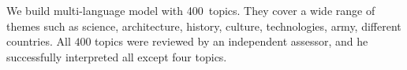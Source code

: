 \documentclass{sig-alternate}
\newcommand{\cond}{\mspace{3mu}{|}\mspace{3mu}}
\begin{document}
We build multi-language model with 400~topics.
They cover a wide range of themes such as science, architecture, history, culture, technologies, army, different countries.
All $400$ topics were reviewed by an independent assessor,
and he successfully interpreted all except four topics.


\end{document}
